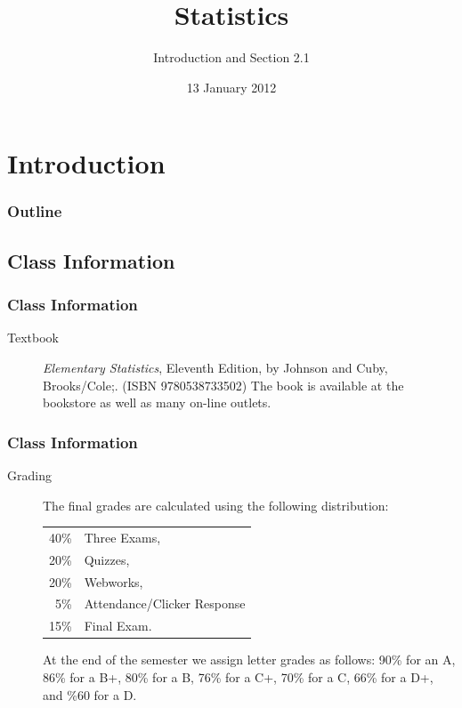 
\section{Introduction}

\title{Statistics}
\subtitle{Introduction and Section 2.1}

\date{13 January 2012}

\begin{frame}
  \titlepage
\end{frame}

\begin{frame}
  \frametitle{Outline}
  \tableofcontents[pausesection,hideothersubsections,sectionstyle=show/hide]
\end{frame}


\subsection{Class Information}


\begin{frame}
  \frametitle{Class Information}

\begin{description}
\item[Textbook] {\em Elementary Statistics}, Eleventh Edition, by
  Johnson and Cuby, Brooks/Cole;. (ISBN 9780538733502) The book is
  available at the bookstore as well as many on-line outlets.

\end{description}

\end{frame}


\begin{frame}
  \frametitle{Class Information}

\begin{description}
\item[Grading] %
  
  The final grades are calculated using the following distribution:
    \begin{tabular}[t]{rl}
      40\% & Three Exams, \\
      20\% & Quizzes, \\
      20\% & Webworks, \\
      5\%  & Attendance/Clicker Response \\
      15\% & Final Exam.
    \end{tabular}
  
    At the end of the semester we assign letter grades as follows:
    90\% for an A, 86\% for a B+, 80\% for a B, 76\% for a C+, 70\%
    for a C, 66\% for a D+, and \%60 for a D.
\end{description}

\end{frame}



